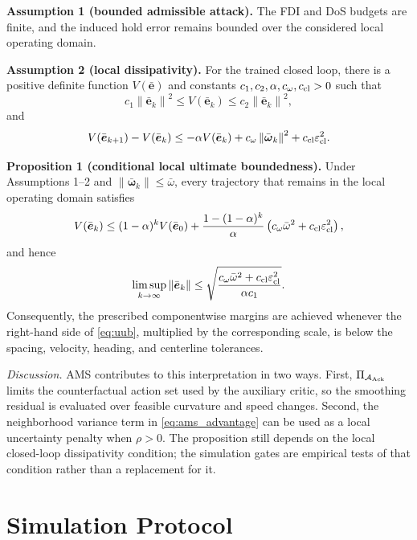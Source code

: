 \documentclass[lettersize,journal]{IEEEtran}
\newcommand{\vect}[1]{\boldsymbol{#1}}
\newcommand{\norm}[1]{\left\lVert #1\right\rVert}
\begin{document}
\textbf{Assumption 1 (bounded admissible attack).} The FDI and DoS budgets are finite, and the induced hold error remains bounded over the considered local operating domain.

\textbf{Assumption 2 (local dissipativity).} For the trained closed loop, there is a positive definite function $V(\bar{\vect e})$ and constants $c_1,c_2,\alpha,c_\omega,c_{\rm cl}>0$ such that
\begin{equation}
c_1\norm{\bar{\vect e}_k}^2
\leq V(\bar{\vect e}_k)
\leq c_2\norm{\bar{\vect e}_k}^2,
\end{equation}
and
\begin{equation}
V(\bar{\vect e}_{k+1})-V(\bar{\vect e}_k)
\leq-\alpha V(\bar{\vect e}_k)
+c_\omega\norm{\bar{\vect\omega}_k}^2
+c_{\rm cl}\varepsilon_{\rm cl}^2.
\label{eq:lyap}
\end{equation}

\textbf{Proposition 1 (conditional local ultimate boundedness).} Under Assumptions 1--2 and $\norm{\bar{\vect\omega}_k}\leq\bar{\omega}$, every trajectory that remains in the local operating domain satisfies
\begin{equation}
V(\bar{\vect e}_k)
\leq(1-\alpha)^kV(\bar{\vect e}_0)
+\frac{1-(1-\alpha)^k}{\alpha}
\left(c_\omega\bar{\omega}^2+c_{\rm cl}\varepsilon_{\rm cl}^2\right),
\end{equation}
and hence
\begin{equation}
\limsup_{k\rightarrow\infty}\norm{\bar{\vect e}_k}
\leq
\sqrt{\frac{c_\omega\bar{\omega}^2+c_{\rm cl}\varepsilon_{\rm cl}^2}{\alpha c_1}}.
\label{eq:uub}
\end{equation}
Consequently, the prescribed componentwise margins are achieved whenever the right-hand side of \eqref{eq:uub}, multiplied by the corresponding scale, is below the spacing, velocity, heading, and centerline tolerances.

\emph{Discussion.} AMS contributes to this interpretation in two ways. First, $\Pi_{\mathcal{A}_{\rm Ack}}$ limits the counterfactual action set used by the auxiliary critic, so the smoothing residual is evaluated over feasible curvature and speed changes. Second, the neighborhood variance term in \eqref{eq:ams_advantage} can be used as a local uncertainty penalty when $\rho>0$. The proposition still depends on the local closed-loop dissipativity condition; the simulation gates are empirical tests of that condition rather than a replacement for it.

\section{Simulation Protocol}
\end{document}
